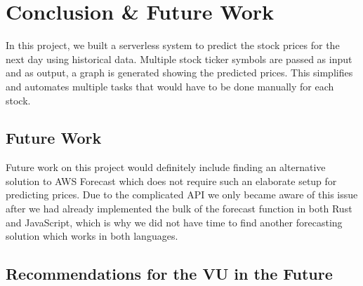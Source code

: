 \chapter{\label{chap:conclusion}Conclusion \& Future Work}

In this project, we built a serverless system to predict the stock prices for the next day using historical data. Multiple stock ticker symbols are passed as input and as output, a graph is generated showing the predicted prices. This simplifies and automates multiple tasks that would have to be done manually for each stock.




%
%
%
\section{Future Work}

Future work on this project would definitely include finding an alternative solution to
AWS Forecast which does not require such an elaborate setup for predicting prices.
Due to the complicated API we only became aware of this issue after we had already
implemented the bulk of the forecast function in both Rust and JavaScript, which is why
we did not have time to find another forecasting solution which works in both languages.



%
%
%
\section{Recommendations for the VU in the Future}

